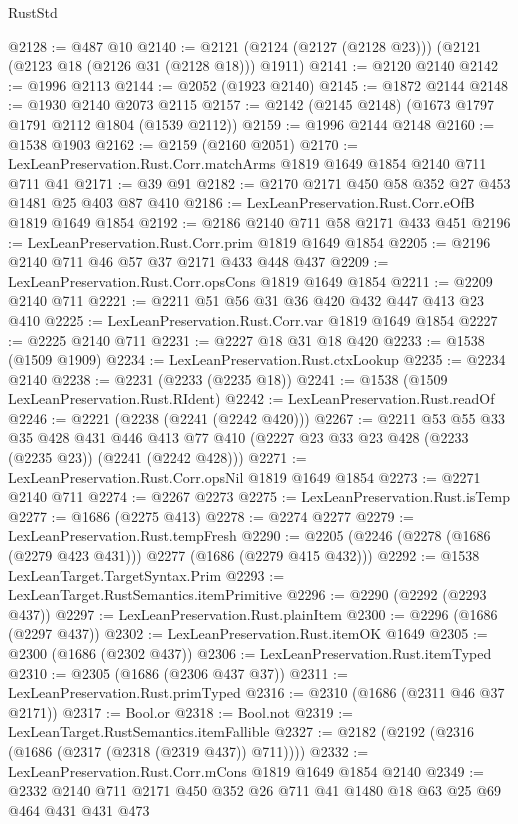 \begin{lexlean}{RustStd}
\begin{coremodule}
@2128 := @487 @10
@2140 := @2121 (@2124 (@2127 (@2128 @23))) (@2121 (@2123 @18 (@2126 @31 (@2128 @18))) @1911)
@2141 := @2120 @2140
@2142 := @1996 @2113
@2144 := @2052 (@1923 @2140)
@2145 := @1872 @2144
@2148 := @1930 @2140 @2073 @2115
@2157 := @2142 (@2145 @2148) (@1673 @1797 @1791 @2112 @1804 (@1539 @2112))
@2159 := @1996 @2144 @2148
@2160 := @1538 @1903
@2162 := @2159 (@2160 @2051)
@2170 := LexLeanPreservation.Rust.Corr.matchArms @1819 @1649 @1854 @2140 @711 @711 @41
@2171 := @39 @91
@2182 := @2170 @2171 @450 @58 @352 @27 @453 @1481 @25 @403 @87 @410
@2186 := LexLeanPreservation.Rust.Corr.eOfB @1819 @1649 @1854
@2192 := @2186 @2140 @711 @58 @2171 @433 @451
@2196 := LexLeanPreservation.Rust.Corr.prim @1819 @1649 @1854
@2205 := @2196 @2140 @711 @46 @57 @37 @2171 @433 @448 @437
@2209 := LexLeanPreservation.Rust.Corr.opsCons @1819 @1649 @1854
@2211 := @2209 @2140 @711
@2221 := @2211 @51 @56 @31 @36 @420 @432 @447 @413 @23 @410
@2225 := LexLeanPreservation.Rust.Corr.var @1819 @1649 @1854
@2227 := @2225 @2140 @711
@2231 := @2227 @18 @31 @18 @420
@2233 := @1538 (@1509 @1909)
@2234 := LexLeanPreservation.Rust.ctxLookup
@2235 := @2234 @2140
@2238 := @2231 (@2233 (@2235 @18))
@2241 := @1538 (@1509 LexLeanPreservation.Rust.RIdent)
@2242 := LexLeanPreservation.Rust.readOf
@2246 := @2221 (@2238 (@2241 (@2242 @420)))
@2267 := @2211
    @53
    @55
    @33
    @35
    @428
    @431
    @446
    @413
    @77
    @410
    (@2227 @23 @33 @23 @428 (@2233 (@2235 @23)) (@2241 (@2242 @428)))
@2271 := LexLeanPreservation.Rust.Corr.opsNil @1819 @1649 @1854
@2273 := @2271 @2140 @711
@2274 := @2267 @2273
@2275 := LexLeanPreservation.Rust.isTemp
@2277 := @1686 (@2275 @413)
@2278 := @2274 @2277
@2279 := LexLeanPreservation.Rust.tempFresh
@2290 := @2205 (@2246 (@2278 (@1686 (@2279 @423 @431))) @2277 (@1686 (@2279 @415 @432)))
@2292 := @1538 LexLeanTarget.TargetSyntax.Prim
@2293 := LexLeanTarget.RustSemantics.itemPrimitive
@2296 := @2290 (@2292 (@2293 @437))
@2297 := LexLeanPreservation.Rust.plainItem
@2300 := @2296 (@1686 (@2297 @437))
@2302 := LexLeanPreservation.Rust.itemOK @1649
@2305 := @2300 (@1686 (@2302 @437))
@2306 := LexLeanPreservation.Rust.itemTyped
@2310 := @2305 (@1686 (@2306 @437 @37))
@2311 := LexLeanPreservation.Rust.primTyped
@2316 := @2310 (@1686 (@2311 @46 @37 @2171))
@2317 := Bool.or
@2318 := Bool.not
@2319 := LexLeanTarget.RustSemantics.itemFallible
@2327 := @2182 (@2192 (@2316 (@1686 (@2317 (@2318 (@2319 @437)) @711))))
@2332 := LexLeanPreservation.Rust.Corr.mCons @1819 @1649 @1854 @2140
@2349 := @2332 @2140 @711 @2171 @450 @352 @26 @711 @41 @1480 @18 @63 @25 @69 @464 @431 @431 @473

\end{coremodule}
\end{lexlean}
